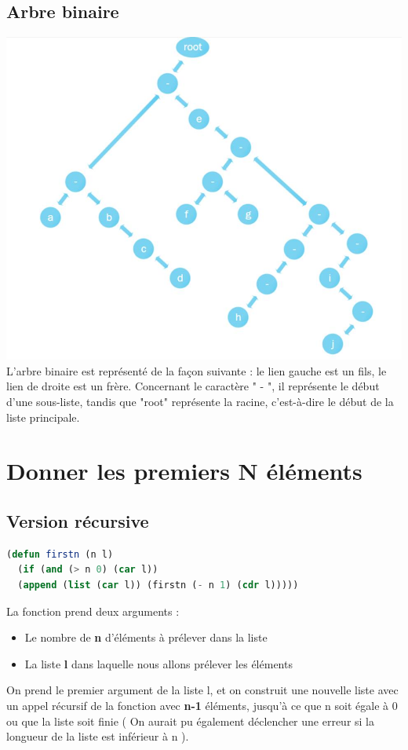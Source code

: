 \documentclass[a4paper,10pt]{report}
\begin{document}
  \subsection*{Arbre binaire}
  \includegraphics[scale = 0.4]{arbreBinaire}\newline
  L'arbre binaire est représenté de la façon suivante : le lien gauche est un fils, le lien de droite est un frère. Concernant le caractère " - ", il représente le début d'une sous-liste, tandis que "root" représente la racine, c'est-à-dire le début de la liste principale.

  
  \newpage
  \section{Donner les premiers N éléments}
  \subsection{Version récursive}
  \begin{lstlisting}[language=Lisp]
(defun firstn (n l)
  (if (and (> n 0) (car l)) 
  (append (list (car l)) (firstn (- n 1) (cdr l)))))
  \end{lstlisting}

  La fonction prend deux arguments :
  \begin{itemize}
   \item Le nombre de \textbf{n} d'éléments à prélever dans la liste
   \item La liste \textbf{l} dans laquelle nous allons prélever les éléments
  \end{itemize}
  On prend le premier argument de la liste l, et on construit une nouvelle liste avec un appel récursif de la fonction avec \textbf{n-1} éléments, 
  jusqu'à ce que n soit égale à 0 ou que la liste soit finie ( On aurait pu également déclencher une erreur si la longueur de la liste est inférieur à n ). \newline
\end{document}
